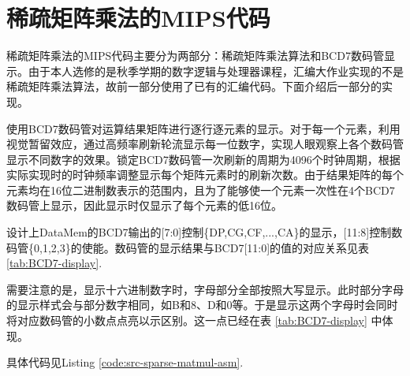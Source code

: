 \section{稀疏矩阵乘法的MIPS代码}

稀疏矩阵乘法的MIPS代码主要分为两部分：稀疏矩阵乘法算法和BCD7数码管显示。由于本人选修的是秋季学期的数字逻辑与处理器课程，汇编大作业实现的不是稀疏矩阵乘法算法，故前一部分使用了已有的汇编代码。下面介绍后一部分的实现。

使用BCD7数码管对运算结果矩阵进行逐行逐元素的显示。对于每一个元素，利用视觉暂留效应，通过高频率刷新轮流显示每一位数字，实现人眼观察上各个数码管显示不同数字的效果。锁定BCD7数码管一次刷新的周期为4096个时钟周期，根据实际实现时的时钟频率调整显示每个矩阵元素时的刷新次数。由于结果矩阵的每个元素均在16位二进制数表示的范围内，且为了能够使一个元素一次性在4个BCD7数码管上显示，因此显示时仅显示了每个元素的低16位。

设计上DataMem的BCD7输出的[7:0]控制\{DP,CG,CF,...,CA\}的显示，[11:8]控制数码管\{0,1,2,3\}的使能。数码管的显示结果与BCD7[11:0]的值的对应关系见表 \ref{tab:BCD7-display}.

需要注意的是，显示十六进制数字时，字母部分全部按照大写显示。此时部分字母的显示样式会与部分数字相同，如B和8、D和0等。于是显示这两个字母时会同时将对应数码管的小数点点亮以示区别。这一点已经在表 \ref{tab:BCD7-display} 中体现。

具体代码见Listing \ref{code:src-sparse-matmul-asm}.

